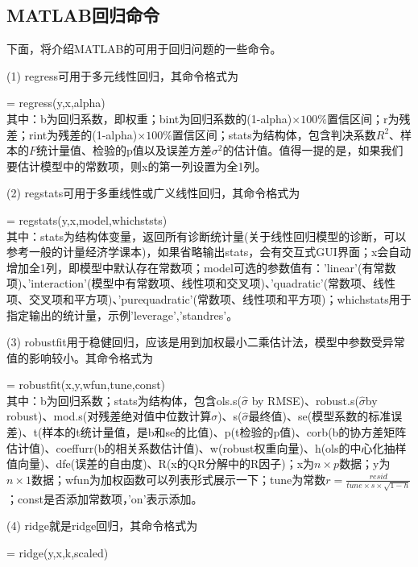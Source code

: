     \subsection{MATLAB回归命令}
        \par
        下面，将介绍MATLAB的可用于回归问题的一些命令。
        \par
        (1) regress可用于多元线性回归，其命令格式为
        \par
        [b,bint,r,rint,stats] = regress(y,x,alpha)\\
        其中：b为回归系数，即权重；bint为回归系数的(1-alpha)$\times 100\%$置信区间；r为残差；rint为残差的(1-alpha)$\times 100\%$置信区间；stats为结构体，包含判决系数$R^2$、样本的$F$统计量值、检验的p值以及误差方差$\sigma^2$的估计值。值得一提的是，如果我们要估计模型中的常数项，则x的第一列设置为全1列。
        \par
        (2) regstats可用于多重线性或广义线性回归，其命令格式为\par
        [stats] = regstats(y,x,model,whichststs)\\
        其中：stats为结构体变量，返回所有诊断统计量(关于线性回归模型的诊断，可以参考一般的计量经济学课本)，如果省略输出stats，会有交互式GUI界面；x会自动增加全1列，即模型中默认存在常数项；model可选的参数值有：'linear'(有常数项)、'interaction'(模型中有常数项、线性项和交叉项)、'quadratic'(常数项、线性项、交叉项和平方项)、'purequadratic'(常数项、线性项和平方项)；whichstats用于指定输出的统计量，示例{'leverage','standres'}。
        \par
        (3) robustfit用于稳健回归，应该是用到加权最小二乘估计法，模型中参数受异常值的影响较小。其命令格式为\par
        [b,stats] = robustfit(x,y,wfun,tune,const)\\
        其中：b为回归系数；stats为结构体，包含ols.s($\hat{\sigma}$ by RMSE)、robust.s($\hat{\sigma}$by robust)、mod.s(对残差绝对值中位数计算$\sigma$)、s($\hat{\sigma}$最终值)、se(模型系数的标准误差)、t(样本的t统计量值，是b和se的比值)、p(t检验的p值)、corb(b的协方差矩阵估计值)、coeffurr(b的相关系数估计值)、w(robust权重向量)、h(ols的中心化抽样值向量)、dfe(误差的自由度)、R(x的QR分解中的R因子)；x为$n\times p$数据；y为$n\times 1$数据；wfun为加权函数\textcolor[rgb]{1 0 0}{可以列表形式展示一下}；tune为常数$r = \frac{resid}{tune \times s \times \sqrt{1-h}}$；const是否添加常数项，'on'表示添加。
        \par
        (4) ridge就是ridge回归，其命令格式为\par
        [b] = ridge(y,x,k,scaled)\\
